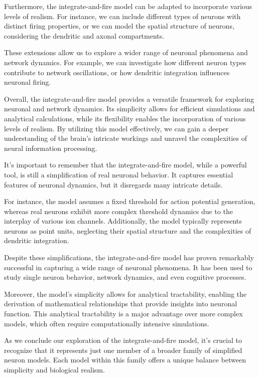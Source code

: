 Furthermore, the integrate-and-fire model can be adapted to incorporate various levels of realism. For instance, we can include different types of neurons with distinct firing properties, or we can model the spatial structure of neurons, considering the dendritic and axonal compartments.

These extensions allow us to explore a wider range of neuronal phenomena and network dynamics. For example, we can investigate how different neuron types contribute to network oscillations, or how dendritic integration influences neuronal firing.

Overall, the integrate-and-fire model provides a versatile framework for exploring neuronal and network dynamics. Its simplicity allows for efficient simulations and analytical calculations, while its flexibility enables the incorporation of various levels of realism. By utilizing this model effectively, we can gain a deeper understanding of the brain's intricate workings and unravel the complexities of neural information processing.

It's important to remember that the integrate-and-fire model, while a powerful tool, is still a simplification of real neuronal behavior. It captures essential features of neuronal dynamics, but it disregards many intricate details.

For instance, the model assumes a fixed threshold for action potential generation, whereas real neurons exhibit more complex threshold dynamics due to the interplay of various ion channels. Additionally, the model typically represents neurons as point units, neglecting their spatial structure and the complexities of dendritic integration.

Despite these simplifications, the integrate-and-fire model has proven remarkably successful in capturing a wide range of neuronal phenomena. It has been used to study single neuron behavior, network dynamics, and even cognitive processes.

Moreover, the model's simplicity allows for analytical tractability, enabling the derivation of mathematical relationships that provide insights into neuronal function. This analytical tractability is a major advantage over more complex models, which often require computationally intensive simulations.

As we conclude our exploration of the integrate-and-fire model, it's crucial to recognize that it represents just one member of a broader family of simplified neuron models. Each model within this family offers a unique balance between simplicity and biological realism.

